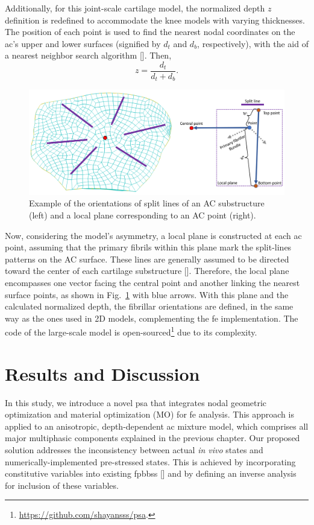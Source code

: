 Additionally, for this joint-scale cartilage model, the normalized depth $z$ definition is redefined to accommodate the knee models with varying thicknesses. The position of each point is used to find the nearest nodal coordinates on the \ac{ac}'s upper and lower surfaces (signified by $d_t$ and $d_b$, respectively), with the aid of a nearest neighbor search algorithm [\cite{maneewongvatana1999}]. Then, 
%
\begin{equation}
    z = \frac{ d_t }{ d_t+d_b }.
\end{equation}
%
\begin{figure}\centering
\includegraphics[width=\textwidth]{img/direction.jpg}
\caption{Example of the orientations of split lines of an AC substructure (left) and a local plane corresponding to an AC point (right).}
\label{fig:split_lines}
\end{figure}
%
Now, considering the model's asymmetry, a local plane is constructed at each \ac{ac} point, assuming that the primary fibrils within this plane mark the split-lines patterns on the AC surface. These lines are generally assumed to be directed toward the center of each cartilage substructure [\cite{mononen2012}]. Therefore, the local plane encompasses one vector facing the central point and another linking the nearest surface points, as shown in Fig.~\ref{fig:split_lines} with blue arrows. With this plane and the calculated normalized depth, the fibrillar orientations are defined, in the same way as the ones used in 2D models, complementing the \ac{fe} implementation. The code of the large-scale model is open-sourced\footnote{\href{https://github.com/shayansss/psa}{https://github.com/shayansss/psa}.} due to its complexity.

\section{Results and Discussion}
%
In this study, we introduce a novel \ac{psa} that integrates nodal geometric optimization and material optimization (MO) for \ac{fe} analysis. This approach is applied to an anisotropic, depth-dependent \ac{ac} mixture model, which comprises all major multiphasic components explained in the previous chapter. Our proposed solution addresses the inconsistency between actual \textit{in vivo} states and numerically-implemented pre-stressed states. This is achieved by incorporating constitutive variables into existing \acp{fpbbs} [\cite{wang2018,bols2013,pandolfi2008}] and by defining an inverse analysis for inclusion of these variables.


